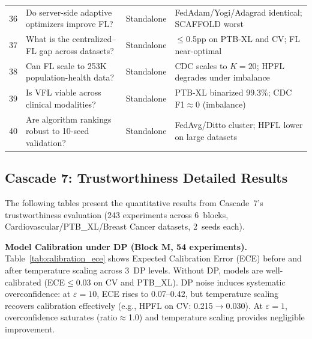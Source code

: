 \documentclass[conference,a4paper]{IEEEtran}
\begin{document}
\begin{table}[htbp]
{\begin{tabular}{clll}
\midrule
36 & Do server-side adaptive optimizers improve FL? & Standalone & FedAdam/Yogi/Adagrad identical; SCAFFOLD worst \\
37 & What is the centralized--FL gap across datasets? & Standalone & $\leq$0.5pp on PTB-XL and CV; FL near-optimal \\
38 & Can FL scale to 253K population-health data? & Standalone & CDC scales to $K{=}20$; HPFL degrades under imbalance \\
39 & Is VFL viable across clinical modalities? & Standalone & PTB-XL binarized 99.3\%; CDC F1$\approx$0 (imbalance) \\
40 & Are algorithm rankings robust to 10-seed validation? & Standalone & FedAvg/Ditto cluster; HPFL lower on large datasets \\
\bottomrule
\end{tabular}%
}
\end{table}

\subsection{Cascade 7: Trustworthiness Detailed Results}

The following tables present the quantitative results from Cascade~7's trustworthiness evaluation (243 experiments across 6~blocks, Cardiovascular/PTB\_XL/Breast Cancer datasets, 2~seeds each).

\smallskip\noindent\textbf{Model Calibration under DP (Block M, 54 experiments).}
Table~\ref{tab:calibration_ece} shows Expected Calibration Error (ECE) before and after temperature scaling across 3~DP levels. Without DP, models are well-calibrated (ECE$\leq$0.03 on CV and PTB\_XL). DP noise induces systematic overconfidence: at $\varepsilon{=}10$, ECE rises to 0.07--0.42, but temperature scaling recovers calibration effectively (e.g., HPFL on CV: 0.215$\to$0.030). At $\varepsilon{=}1$, overconfidence saturates (ratio$\approx$1.0) and temperature scaling provides negligible improvement.
\end{document}

